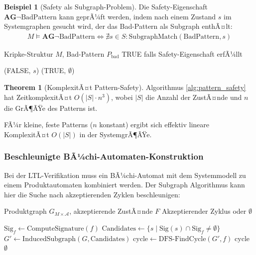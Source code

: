 ﻿\documentclass[a4paper,12pt]{article}
\theoremstyle{definition}
\newtheorem{beispiel}{Beispiel}[section]
\newtheorem{theorem}{Theorem}[section]
\begin{document}
\begin{beispiel}[Safety als Subgraph-Problem]
	Die Safety-Eigenschaft $\mathbf{AG}\neg\text{BadPattern}$ kann geprÃ¼ft werden, indem nach einem Zustand $s$ im Systemgraphen gesucht wird, der das Bad-Pattern als Subgraph enthÃ¤lt:
	\begin{align}
	M \models \mathbf{AG}\neg\text{BadPattern} \iff \nexists s \in S: \text{SubgraphMatch}(\text{BadPattern}, s)
	\end{align}
\end{beispiel}

\begin{algorithm}[H]
	\caption{Musterbasierte Safety-PrÃ¼fung}
	\label{alg:pattern_safety}
	\begin{algorithmic}[1]
		\Eingabe Kripke-Struktur $M$, Bad-Pattern $P_{\text{bad}}$
		\Ausgabe TRUE falls Safety-Eigenschaft erfÃ¼llt
		
		 
		 
		\State \Return (FALSE, $s$) 
		\EndeWenn
		\EndeFuer
		\State \Return (TRUE, $\emptyset$)
	\end{algorithmic}
\end{algorithm}

\begin{theorem}[KomplexitÃ¤t Pattern-Safety]
	Algorithmus \ref{alg:pattern_safety} hat ZeitkomplexitÃ¤t $O(|S| \cdot n^3)$, wobei $|S|$ die Anzahl der ZustÃ¤nde und $n$ die GrÃ¶ÃŸe des Patterns ist.
\end{theorem}

FÃ¼r kleine, feste Patterns ($n$ konstant) ergibt sich effektiv lineare KomplexitÃ¤t $O(|S|)$ in der SystemgrÃ¶ÃŸe.

\subsubsection{Beschleunigte BÃ¼chi-Automaten-Konstruktion}

Bei der LTL-Verifikation muss ein BÃ¼chi-Automat mit dem Systemmodell zu einem Produktautomaten kombiniert werden. Der Subgraph Algorithmus kann hier die Suche nach akzeptierenden Zyklen beschleunigen:

\begin{algorithm}[H]
	\caption{Subgraph-beschleunigte Kreiserkennung}
	\label{alg:subgraph_cycle}
	\begin{algorithmic}[1]
		\Eingabe Produktgraph $G_{M \times \mathcal{A}}$, akzeptierende ZustÃ¤nde $F$
		\Ausgabe Akzeptierender Zyklus oder $\emptyset$
		
		 
		\State $\text{Sig}_f \gets \text{ComputeSignature}(f)$
		\State $\text{Candidates} \gets \{s \mid \text{Sig}(s) \cap \text{Sig}_f \neq \emptyset\}$
		\State $G' \gets \text{InducedSubgraph}(G, \text{Candidates})$
		\State $\text{cycle} \gets \text{DFS-FindCycle}(G', f)$ 
		\State \Return $\text{cycle}$
		\EndeWenn
		\EndeFuer
		\State \Return $\emptyset$
	\end{algorithmic}
\end{algorithm}
\end{document}
